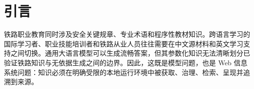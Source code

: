 \begin{abstract}

\textbf{研究背景。} 中国高铁技术的国际化应用不断扩大，使双语知识传递与职业培训需求持续增长。现有铁路大语言模型研究往往分别考察领域适配或检索增强生成，对双语模型适配、治理式检索、证据来源与资源约束部署之间的协同关系缺少联合验证。因此，本研究以知识增强型大语言模型为核心，并构建受约束人工智能智能体系统作为可控的实验与应用环境，面向国际学习者和职业培训学员、铁路技术与服务从业者，以及培训、咨询和管理人员。

\textbf{研究方法。} 研究构建专家治理的双语铁路语料，并采用按知识对分组的控制策略，隔离训练、验证与留出评估记录。实验比较 Qwen2.5-7B 和 GLM-4-9B 在双语 QLoRA 适配前后的表现，并以 Qwen3-14B 作为参考模型；在留出双语查询上比较 BM25、BGE-M3 密集检索与倒数排名融合混合检索。模型适配采用独立的双语问答评估，并辅以受控的无检索生成与检索增强生成比较。评价指标包括证据 Recall@k、平均倒数排名、Answer F1、配对显著性、证据支持度和单机部署资源使用。

\textbf{研究结果。} 混合检索在中文和英文上的证据 Recall@5 分别达到 0.715 和 0.708，均高于对应最优单一检索器的 0.690 和 0.685；双语字段索引取得最高的跨语言均衡均值 0.696。Qwen QLoRA 将中文留出问答字符级 F1 从 0.189 提升至 0.398，将英文从 0.437 提升至 0.648，且两项提升经 Holm 校正后仍具有显著性。在混合检索增强生成条件下，其 Answer F1 达到最高的 0.660 和 0.651，高于 Qwen3-14B 参考模型的 0.442 和 0.454。所有被评估生成器条件均在定义的单机资源边界内完成运行。

\textbf{研究结论。} 将双语参数高效适配与治理式混合检索相结合，可以在资源约束的单机部署条件下提升跨语言证据访问和领域问答表现。该模型研究框架为联合评价模型适配、知识检索与证据治理提供了可迁移的方法，也为双语铁路职业教育和国际从业人员培训提供了可本地控制的技术基础。

\textbf{关键词：} 知识增强型大语言模型；双语领域适配；检索增强生成；证据约束生成；铁路职业教育；资源约束部署；受约束人工智能智能体；Web 信息系统

\end{abstract}

\section{引言}

铁路职业教育同时涉及安全关键规章、专业术语和程序性教材知识。跨语言学习的国际学习者、职业技能培训者和铁路从业人员往往需要在中文源材料和英文学习支持之间切换。通用大语言模型可以生成流畅答案，但其参数化知识无法清晰划分已验证铁路知识与无依据生成之间的边界。因此，这既是模型问题，也是 Web 信息系统问题：知识必须在明确受限的本地运行环境中被获取、治理、检索、呈现并追溯到来源。

